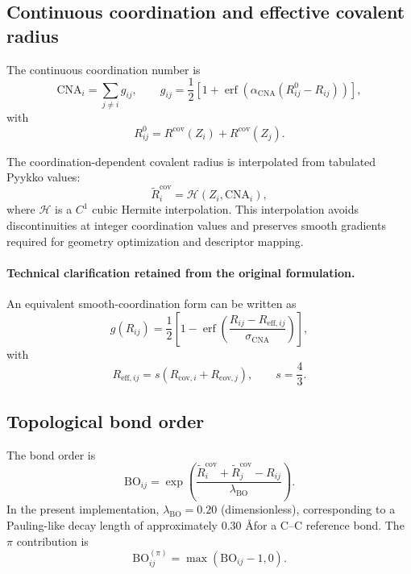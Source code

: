 \documentclass[journal=jctcce,manuscript=article]{achemso}
\begin{document}
\subsection{Continuous coordination and effective covalent radius}
The continuous coordination number is
\begin{equation}
\mathrm{CNA}_i=\sum_{j\neq i} g_{ij},
\qquad
g_{ij}=\frac{1}{2}\left[1+\operatorname{erf}\!\left(\alpha_{\mathrm{CNA}}(R^0_{ij}-R_{ij})\right)\right],
\end{equation}
with
\begin{equation}
R^0_{ij}=R^{\mathrm{cov}}(Z_i)+R^{\mathrm{cov}}(Z_j).
\end{equation}

The coordination-dependent covalent radius is interpolated from tabulated Pyykko values:
\begin{equation}
\tilde R^{\mathrm{cov}}_i=\mathcal{H}(Z_i,\mathrm{CNA}_i),
\end{equation}
where $\mathcal{H}$ is a $C^1$ cubic Hermite interpolation.
This interpolation avoids discontinuities at integer coordination values and preserves smooth gradients required for geometry optimization and descriptor mapping.

\paragraph{Technical clarification retained from the original formulation.}
An equivalent smooth-coordination form can be written as
\begin{equation}
g(R_{ij})=
\frac{1}{2}\left[
1-\operatorname{erf}\!\left(
\frac{R_{ij}-R_{\mathrm{eff},ij}}
{\sigma_{\mathrm{CNA}}}
\right)\right],
\end{equation}
with
\begin{equation}
R_{\mathrm{eff},ij}=s\left(R_{\mathrm{cov},i}+R_{\mathrm{cov},j}\right),
\qquad s=\frac{4}{3}.
\end{equation}

\subsection{Topological bond order}
The bond order is
\begin{equation}
\mathrm{BO}_{ij}=\exp\!\left(\frac{\tilde R^{\mathrm{cov}}_i+\tilde R^{\mathrm{cov}}_j-R_{ij}}{\lambda_{\mathrm{BO}}}\right).
\label{eq:bo_topo}
\end{equation}
In the present implementation, $\lambda_{\mathrm{BO}}=0.20$ (dimensionless), corresponding to a Pauling-like decay length of approximately 0.30 \AA for a C--C reference bond.
The $\pi$ contribution is
\begin{equation}
\mathrm{BO}^{(\pi)}_{ij}=\max(\mathrm{BO}_{ij}-1,0).
\end{equation}
\end{document}
